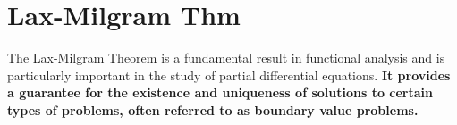 \documentclass[a4paper,12pt]{article} %
\begin{document}


\newpage
\section{\textbf{Lax-Milgram Thm}}
The Lax-Milgram Theorem is a fundamental result in functional analysis and is particularly important in the study of partial differential equations. 
\textbf{It provides a guarantee for the existence and uniqueness of solutions to certain types of problems, often referred to as boundary value problems.}
\end{document}
